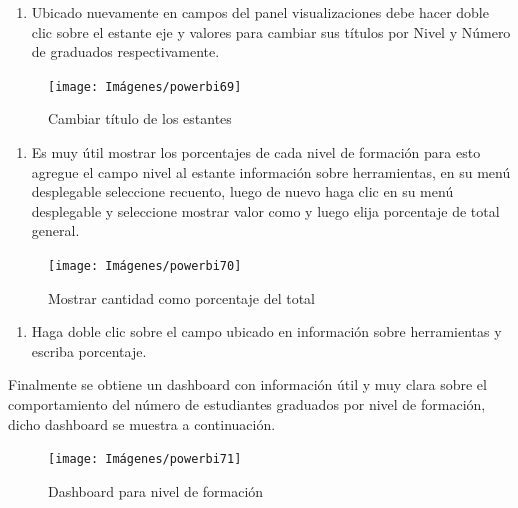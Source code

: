 \documentclass[
]{book}
\providecommand{\tightlist}{%
  \setlength{\itemsep}{0pt}\setlength{\parskip}{0pt}}
\begin{document}
\begin{enumerate}
\def\labelenumi{\arabic{enumi}.}
\setcounter{enumi}{5}
\tightlist
\item
  Ubicado nuevamente en campos del panel visualizaciones debe hacer doble clic sobre el estante eje y valores para cambiar sus títulos por Nivel y Número de graduados respectivamente.
\end{enumerate}

\begin{figure}

{\centering \texttt{[image: Imágenes/powerbi69]} 

}

\caption{Cambiar título de los estantes}\label{fig:paso6barras-fig}
\end{figure}

\begin{enumerate}
\def\labelenumi{\arabic{enumi}.}
\setcounter{enumi}{6}
\tightlist
\item
  Es muy útil mostrar los porcentajes de cada nivel de formación para esto agregue el campo nivel al estante información sobre herramientas, en su menú desplegable seleccione recuento, luego de nuevo haga clic en su menú desplegable y seleccione mostrar valor como y luego elija porcentaje de total general.
\end{enumerate}

\begin{figure}

{\centering \texttt{[image: Imágenes/powerbi70]} 

}

\caption{Mostrar cantidad como porcentaje del total}\label{fig:paso7barras-fig}
\end{figure}

\begin{enumerate}
\def\labelenumi{\arabic{enumi}.}
\setcounter{enumi}{7}
\tightlist
\item
  Haga doble clic sobre el campo ubicado en información sobre herramientas y escriba porcentaje.
\end{enumerate}

Finalmente se obtiene un dashboard con información útil y muy clara sobre el comportamiento del número de estudiantes graduados por nivel de formación, dicho dashboard se muestra a continuación.

\begin{figure}

{\centering \texttt{[image: Imágenes/powerbi71]} 

}

\caption{Dashboard para nivel de formación}\label{fig:tableronivelformacion-fig}
\end{figure}
\end{document}
